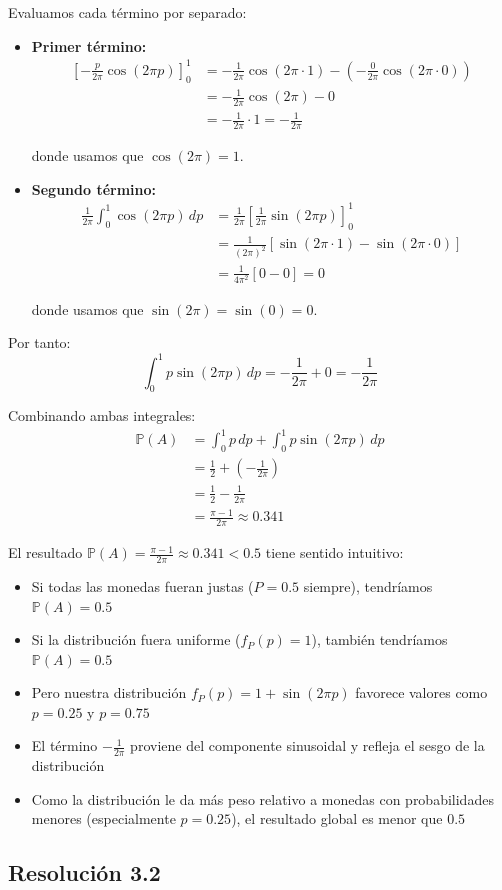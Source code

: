 \documentclass[
  11pt,
  letterpaper,
   addpoints,
  answers
  ]{exam}
\begin{document}
\begin{questions}
\begin{solution}
Evaluamos cada término por separado:
\begin{itemize}
  \item \textbf{Primer término:}
\begin{align}
\left[-\frac{p}{2\pi}\cos(2\pi p)\right]_0^1 &= -\frac{1}{2\pi}\cos(2\pi \cdot 1) - \left(-\frac{0}{2\pi}\cos(2\pi \cdot 0)\right) \\
&= -\frac{1}{2\pi}\cos(2\pi) - 0 \\
&= -\frac{1}{2\pi} \cdot 1 = -\frac{1}{2\pi}
\end{align}

donde usamos que $\cos(2\pi) = 1$.

\item \textbf{Segundo término:}
\begin{align}
\frac{1}{2\pi}\int_0^1 \cos(2\pi p) \, dp &= \frac{1}{2\pi} \left[\frac{1}{2\pi}\sin(2\pi p)\right]_0^1 \\
&= \frac{1}{(2\pi)^2}[\sin(2\pi \cdot 1) - \sin(2\pi \cdot 0)] \\
&= \frac{1}{4\pi^2}[0 - 0] = 0
\end{align}

donde usamos que $\sin(2\pi) = \sin(0) = 0$.
\end{itemize}
Por tanto:
\begin{equation}
\int_0^1 p \sin(2\pi p) \, dp = -\frac{1}{2\pi} + 0 = -\frac{1}{2\pi}
\end{equation}

Combinando ambas integrales:
\begin{align}
\mathbb{P}(A) &= \int_0^1 p \, dp + \int_0^1 p \sin(2\pi p) \, dp \\
&= \frac{1}{2} + \left(-\frac{1}{2\pi}\right) \\
&= \frac{1}{2} - \frac{1}{2\pi} \\
&= \frac{\pi - 1}{2\pi} \approx 0.341
\end{align}


El resultado $\mathbb{P}(A) = \frac{\pi - 1}{2\pi} \approx 0.341 < 0.5$ tiene sentido intuitivo:

\begin{itemize}
\item Si todas las monedas fueran justas ($P = 0.5$ siempre), tendríamos $\mathbb{P}(A) = 0.5$
\item Si la distribución fuera uniforme ($f_P(p) = 1$), también tendríamos $\mathbb{P}(A) = 0.5$
\item Pero nuestra distribución $f_P(p) = 1 + \sin(2\pi p)$ favorece valores como $p = 0.25$ y $p = 0.75$
\item El término $-\frac{1}{2\pi}$ proviene del componente sinusoidal y refleja el sesgo de la distribución
\item Como la distribución le da más peso relativo a monedas con probabilidades menores (especialmente $p = 0.25$), el resultado global es menor que $0.5$
\end{itemize}\subsection*{Resolución 3.2}


\end{solution}
\end{questions}
\end{document}

